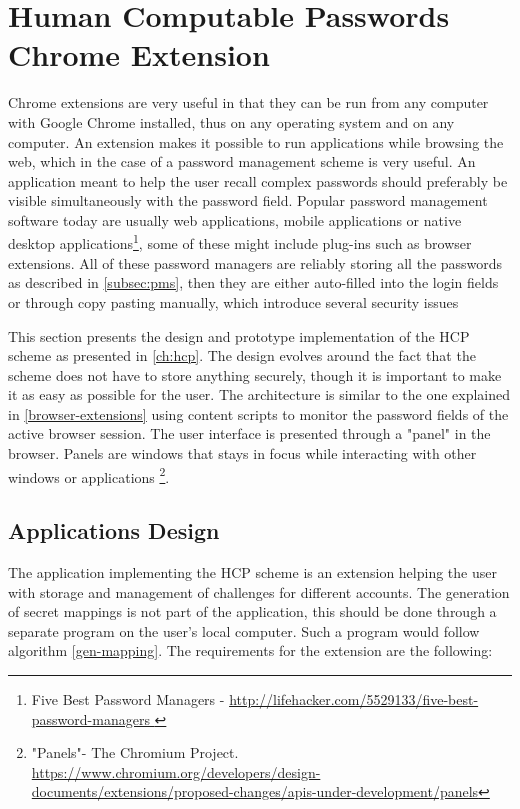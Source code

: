 \section{Human Computable Passwords Chrome Extension}
Chrome extensions are very useful in that they can be run from any computer with Google Chrome installed, thus on any operating system and on any computer. An extension makes it possible to run applications while browsing the web, which in the case of a password management scheme is very useful. An application meant to help the user recall complex passwords should preferably be visible simultaneously with the password field. Popular password management software today are usually web applications, mobile applications or native desktop applications\footnote{Five Best Password Managers - \url{ http://lifehacker.com/5529133/five-best-password-managers }}, some of these might include plug-ins such as browser extensions. All of these password managers are reliably storing all the passwords as described in \autoref{subsec:pms}, then they are either auto-filled into the login fields or through copy pasting manually, which introduce several security issues\cite{protecting-browsers, javascript-injection, chrome-extension-dangers, carlini-chrome, liu-chrome, pw-managment-attacks}
\par This section presents the design and prototype implementation of the HCP scheme as presented in \autoref{ch:hcp}. The design evolves around the fact that the scheme does not have to store anything securely, though it is important to make it as easy as possible for the user. The architecture is similar to the one explained in \autoref{browser-extensions} using content scripts to monitor the password fields of the active browser session. The user interface is presented through a "panel" in the browser. Panels are windows that stays in focus while interacting with other windows or applications \footnote{"Panels"- The Chromium Project. \url{https://www.chromium.org/developers/design-documents/extensions/proposed-changes/apis-under-development/panels}}.




\subsection{Applications Design}
The application implementing the HCP scheme is an extension helping the user with storage and management of challenges for different accounts. The generation of secret mappings is not part of the application, this should be done through a separate program on the user's local computer. Such a program would follow algorithm \ref{gen-mapping}. The requirements for the extension are the following:

